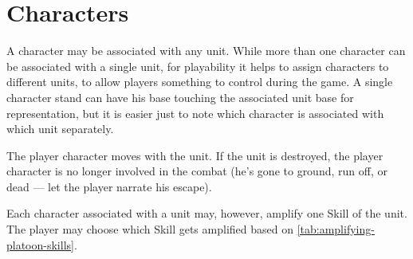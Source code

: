 \iflandscape{}{\newpage}
\section{Characters}\label{sec:characters-in-platoon-combat}



A character may be associated with any unit. While more than one character can be associated with a single unit, for playability it helps to assign characters to different units, to allow players something to control during the game. A single character stand can have his base touching the associated unit base for representation, but it is easier just to note which character is associated with which unit separately. 

The player character moves with the unit. If the unit is destroyed, the player character is no longer involved in the combat (he's gone to ground, run off, or dead --- let the player narrate his escape).

Each character associated with a unit may, however, amplify one Skill of the unit. The player may choose which Skill gets amplified based on \autoref{tab:amplifying-platoon-skills}.


